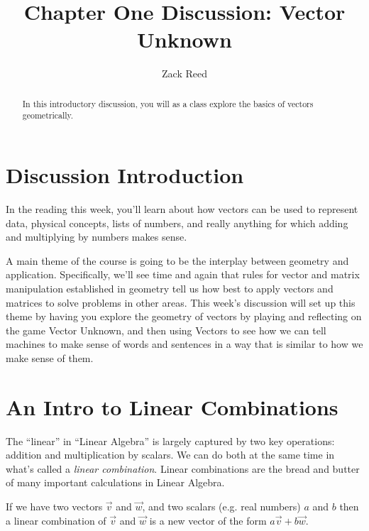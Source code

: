 \documentclass{ximera}
\author{Zack Reed}
\title{Chapter One Discussion: Vector Unknown}
\begin{document}
\begin{abstract}

    In this introductory discussion, you will as a class explore the basics of vectors geometrically.

\end{abstract}
\maketitle


\section{Discussion Introduction}

  In the reading this week, you'll learn about how vectors can be used to represent data, physical concepts, lists of numbers, and really anything for which adding and multiplying by numbers makes sense. 
  
  A main theme of the course is going to be the interplay between geometry and application. Specifically, we'll see time and again that rules for vector and matrix manipulation established in geometry tell us how best to apply vectors and matrices to solve problems in other areas. This week's discussion will set up this theme by having you explore the geometry of vectors by playing and reflecting on the game Vector Unknown, and then using Vectors to see how we can tell machines to make sense of words and sentences in a way that is similar to how we make sense of them.

\section{An Intro to Linear Combinations}

  The ``linear'' in  ``Linear Algebra'' is largely captured by two key operations: addition and multiplication by scalars. We can do both at the same time in what's called a \emph{linear combination}. Linear combinations are the bread and butter of many important calculations in Linear Algebra. 

  If we have two vectors $\vec{v}$ and $\vec{w}$, and two scalars (e.g. real numbers) $a$ and $b$ then a linear combination of $\vec{v}$ and $\vec{w}$ is a new vector of the form $a\vec{v} + b\vec{w}$.
\end{document}
